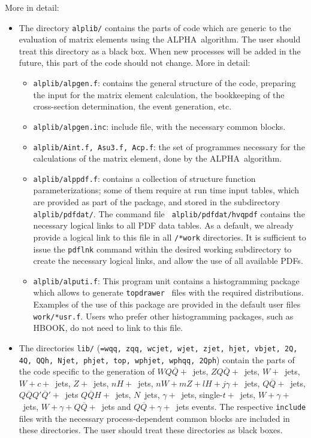 \documentclass[paper]{JHEP3}
\def    \Qbar   {\overline{Q}}
\def\ALPHA{{\small ALPHA}}
\begin{document}
\begin{appendix}
More in detail:
\begin{itemize}
\item The directory {\tt alplib/} contains the parts of code which are
  generic to the evaluation of matrix elements using the \ALPHA\ 
  algorithm.  The user should treat this directory as a black box.
  When new processes will be added in the future, this part of the
  code should not change.  More in detail:
  \begin{itemize}
  \item {\tt alplib/alpgen.f}: contains the general structure of the
    code, preparing the input for the matrix element calculation, the
    bookkeeping of the cross-section determination, the event
    generation, etc.
  \item {\tt alplib/alpgen.inc}: include file, with the necessary common
    blocks.
  \item {\tt alplib/Aint.f, Asu3.f, Acp.f}: the set of programmes
    necessary for the calculations of the matrix element, done by the
    \ALPHA\  algorithm.
  \item {\tt alplib/alppdf.f}: contains a collection of structure
    function parameterizations; some of them require at run time input
    tables, which are provided as part of the package, and stored in
    the subdirectory {\tt alplib/pdfdat/}. The command file {\tt
      alplib/pdfdat/hvqpdf} contains the necessary logical links to
    all PDF data tables. As a default, we already provide a logical
    link to this file in all {\tt /*work} directories. It is
    sufficient to issue the {\tt pdflnk} command within the desired
    working subdirectory to create the necessary logical links, and
    allow the use of all available PDFs.
  \item {\tt alplib/alputi.f}: This program unit contains a
    histogramming package which allows to generate
    {\tt topdrawer}~\cite{topdrawer}  files with
    the required distributions. Examples of the use of this package
    are provided in the default user files {\tt *work/*usr.f}.  
    Users who prefer other histogramming packages, such as HBOOK, do
    not need to link to this file.
  \end{itemize}
  
\item The directories {\tt *lib/} ({\tt *=wqq, zqq, wcjet, wjet, zjet, hjet,
    vbjet, 2Q, 4Q, QQh, Njet, phjet, top, wphjet, wphqq, 2Qph}) 
      contain the parts of the code
    specific to the generation of $WQ\Qbar+$~jets, $ZQ\Qbar+$~jets,
    $W+$~jets, $W+c+$~jets, $Z+$~jets, $nH+$~jets, $nW+mZ+lH+j\gamma+$~jets,
    $Q\Qbar+$~jets, $Q\Qbar Q'\Qbar'+$~jets $Q\Qbar H+$~jets, $N$~jets,
    $\gamma+$~jets, single-$t+$~jets,  $W+\gamma+$~jets,  
    $W+\gamma+Q\Qbar+$~jets and $Q\Qbar+\gamma+$~jets events.  
    The respective {\tt include} files with
    the necessary process-dependent common blocks are included in
    these directories.  The user should treat these directories as
    black boxes.
  

\end{itemize}
\end{appendix}
\end{document}

